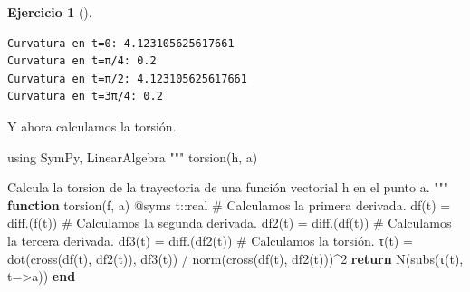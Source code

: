 \documentclass[
  a4paper,
]{scrreport}
\newenvironment{Shaded}{\begin{snugshade}}{\end{snugshade}}
\newcommand{\BuiltInTok}[1]{\textcolor[rgb]{0.00,0.23,0.31}{#1}}
\newcommand{\CommentTok}[1]{\textcolor[rgb]{0.37,0.37,0.37}{#1}}
\newcommand{\ConstantTok}[1]{\textcolor[rgb]{0.56,0.35,0.01}{#1}}
\newcommand{\ControlFlowTok}[1]{\textcolor[rgb]{0.00,0.23,0.31}{\textbf{#1}}}
\newcommand{\DataTypeTok}[1]{\textcolor[rgb]{0.68,0.00,0.00}{#1}}
\newcommand{\FloatTok}[1]{\textcolor[rgb]{0.68,0.00,0.00}{#1}}
\newcommand{\FunctionTok}[1]{\textcolor[rgb]{0.28,0.35,0.67}{#1}}
\newcommand{\ImportTok}[1]{\textcolor[rgb]{0.00,0.46,0.62}{#1}}
\newcommand{\KeywordTok}[1]{\textcolor[rgb]{0.00,0.23,0.31}{\textbf{#1}}}
\newcommand{\NormalTok}[1]{\textcolor[rgb]{0.00,0.23,0.31}{#1}}
\newcommand{\OperatorTok}[1]{\textcolor[rgb]{0.37,0.37,0.37}{#1}}
\newcommand{\PreprocessorTok}[1]{\textcolor[rgb]{0.68,0.00,0.00}{#1}}
\newcommand{\SpecialCharTok}[1]{\textcolor[rgb]{0.37,0.37,0.37}{#1}}
\newcommand{\StringTok}[1]{\textcolor[rgb]{0.13,0.47,0.30}{#1}}
\theoremstyle{definition}
\newtheorem{exercise}{Ejercicio}[chapter]
\theoremstyle{remark}
\begin{document}
\begin{exercise}[]
\begin{tcolorbox}
\begin{Shaded}
\end{Shaded}

\begin{verbatim}
Curvatura en t=0: 4.123105625617661
Curvatura en t=π/4: 0.2
Curvatura en t=π/2: 4.123105625617661
Curvatura en t=3π/4: 0.2
\end{verbatim}

Y ahora calculamos la torsión.

\begin{Shaded}
\begin{Highlighting}[]
\ImportTok{using} \BuiltInTok{SymPy}\NormalTok{, }\BuiltInTok{LinearAlgebra}
\StringTok{"""}
\StringTok{    torsion(h, a)}

\StringTok{Calcula la torsion de la trayectoria de una función vectorial h en el punto a.}
\StringTok{"""}
\KeywordTok{function} \FunctionTok{torsion}\NormalTok{(f, a)}
    \PreprocessorTok{@syms}\NormalTok{ t}\OperatorTok{::}\DataTypeTok{real}
    \CommentTok{\# Calculamos la primera derivada.}
    \FunctionTok{df}\NormalTok{(t) }\OperatorTok{=} \FunctionTok{diff}\NormalTok{.(}\FunctionTok{f}\NormalTok{(t))}
    \CommentTok{\# Calculamos la segunda derivada.}
    \FunctionTok{df2}\NormalTok{(t) }\OperatorTok{=} \FunctionTok{diff}\NormalTok{.(}\FunctionTok{df}\NormalTok{(t))}
    \CommentTok{\# Calculamos la tercera derivada.}
    \FunctionTok{df3}\NormalTok{(t) }\OperatorTok{=} \FunctionTok{diff}\NormalTok{.(}\FunctionTok{df2}\NormalTok{(t))}
    \CommentTok{\# Calculamos la torsión.}
    \FunctionTok{τ}\NormalTok{(t) }\OperatorTok{=} \FunctionTok{dot}\NormalTok{(}\FunctionTok{cross}\NormalTok{(}\FunctionTok{df}\NormalTok{(t), }\FunctionTok{df2}\NormalTok{(t)), }\FunctionTok{df3}\NormalTok{(t)) }\OperatorTok{/} \FunctionTok{norm}\NormalTok{(}\FunctionTok{cross}\NormalTok{(}\FunctionTok{df}\NormalTok{(t), }\FunctionTok{df2}\NormalTok{(t)))}\OperatorTok{\^{}}\FloatTok{2}
    \ControlFlowTok{return} \FunctionTok{N}\NormalTok{(}\FunctionTok{subs}\NormalTok{(}\FunctionTok{τ}\NormalTok{(t), t}\OperatorTok{=\textgreater{}}\NormalTok{a))}
\KeywordTok{end}


\end{Highlighting}
\end{Shaded}
\end{tcolorbox}
\end{exercise}
\end{document}
